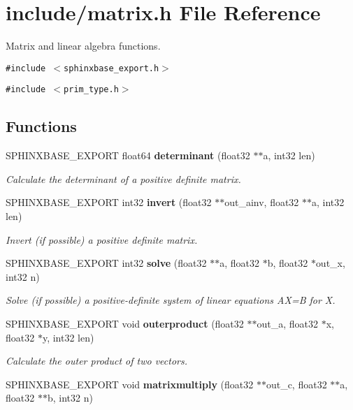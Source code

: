 \section{include/matrix.h File Reference}
\label{matrix_8h}
Matrix and linear algebra functions.  


{\tt \#include $<$sphinxbase\_\-export.h$>$}\par
{\tt \#include $<$prim\_\-type.h$>$}\par
\subsection*{Functions}
\begin{CompactItemize}
\item 
SPHINXBASE\_\-EXPORT float64 {\bf determinant} (float32 $\ast$$\ast$a, int32 len)
\begin{CompactList}\small\item\em Calculate the determinant of a positive definite matrix. \item\end{CompactList}\item 
SPHINXBASE\_\-EXPORT int32 {\bf invert} (float32 $\ast$$\ast$out\_\-ainv, float32 $\ast$$\ast$a, int32 len)
\begin{CompactList}\small\item\em Invert (if possible) a positive definite matrix. \item\end{CompactList}\item 
SPHINXBASE\_\-EXPORT int32 {\bf solve} (float32 $\ast$$\ast$a, float32 $\ast$b, float32 $\ast$out\_\-x, int32 n)
\begin{CompactList}\small\item\em Solve (if possible) a positive-definite system of linear equations AX=B for X. \item\end{CompactList}\item 
SPHINXBASE\_\-EXPORT void {\bf outerproduct} (float32 $\ast$$\ast$out\_\-a, float32 $\ast$x, float32 $\ast$y, int32 len)
\begin{CompactList}\small\item\em Calculate the outer product of two vectors. \item\end{CompactList}\item 
SPHINXBASE\_\-EXPORT void {\bf matrixmultiply} (float32 $\ast$$\ast$out\_\-c, float32 $\ast$$\ast$a, float32 $\ast$$\ast$b, int32 n)

\end{CompactItemize}
